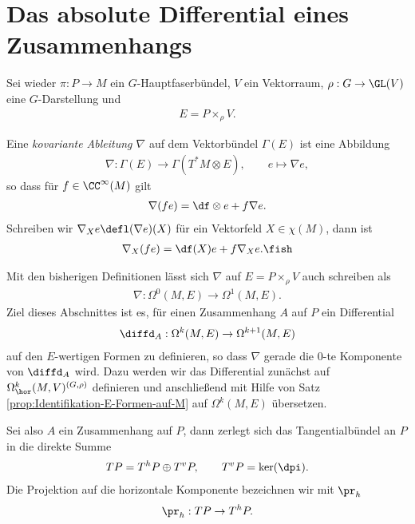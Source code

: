 \documentclass[%
	paper=a5,%
	fleqn,%
	DIV=18,%
	BCOR=0mm,
	fontsize=11pt,
	titlepage=false,%
	bibliography=totoc,
	DIV=18,%
	twoside=true,
	pdftitle=Riemannsche Geometrie,
	pdfauthor=Uwe Semmelmann,
	numbers=noendperiod]%
	{scrbook}
\begin{document}
\section{Das absolute Differential eines Zusammenhangs}

Sei wieder $\pi: P\to M$ ein $G$-Hauptfaserbündel, $V$ ein Vektorraum, $\rho:
G\to \GL(V)$ eine $G$-Darstellung und
\begin{align*}
E = P\times_\rho V.
\end{align*}

\begin{defn}
Eine \emph{kovariante Ableitung $\nabla$} auf dem Vektorbündel $\Gamma(E)$ ist
eine Abbildung
\begin{align*}
\nabla : \Gamma(E)\to \Gamma(T^*M\otimes E),\qquad
e \mapsto \nabla e,
\end{align*}
so dass für $f\in\CC^\infty(M)$ gilt
\begin{align*}
\nabla (fe) = \df\otimes e + f\nabla e.
\end{align*}
Schreiben wir $\nabla_X e \defl (\nabla e)(X)$ für ein Vektorfeld $X\in\chi(M)$,
dann ist
\begin{align*}
\nabla_X(fe) = \df(X)e + f \nabla_X e.\fish
\end{align*} 
\end{defn}

Mit den bisherigen Definitionen lässt sich $\nabla$ auf $E=P\times_\rho V$ auch
schreiben als
\begin{align*}
\nabla: \Omega^0(M,E) \to \Omega^1(M,E).
\end{align*}
Ziel dieses Abschnittes ist es, für einen Zusammenhang $A$ auf $P$ ein
Differential
\begin{align*}
\diffd_A : \Omega^k(M,E)\to \Omega^{k+1}(M,E)
\end{align*}
auf den $E$-wertigen Formen zu definieren, so dass $\nabla$ gerade die $0$-te
Komponente von $\diffd_A$ wird. Dazu werden wir das Differential zunächst
auf $\Omega_\hor^k(M,V)^{(G,\rho)}$ definieren und anschließend mit Hilfe von
Satz \ref{prop:Identifikation-E-Formen-auf-M} auf $\Omega^k(M,E)$ übersetzen.

Sei also $A$ ein Zusammenhang auf $P$, dann zerlegt sich das Tangentialbündel an
$P$ in die direkte Summe
\begin{align*}
TP = T^hP\oplus T^vP,\qquad T^vP = \ker(\dpi).
\end{align*}
Die Projektion auf die horizontale Komponente bezeichnen wir mit $\pr_h$
\begin{align*}
\pr_h : TP \to T^hP.
\end{align*}
\end{document}
